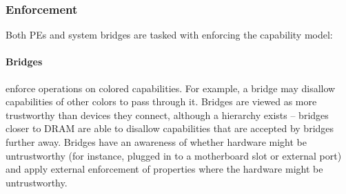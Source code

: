 

\subsubsection{Enforcement}
Both PEs and system bridges are tasked with enforcing the capability model:

\paragraph{Bridges} enforce operations on colored capabilities.  For example, a bridge may disallow capabilities of other colors to pass through it.  Bridges are viewed as more trustworthy than devices they connect, although a hierarchy exists -- bridges closer to DRAM are able to disallow capabilities that are accepted by bridges further away.  Bridges have an awareness of whether hardware might be untrustworthy (for instance, plugged in to a motherboard slot or external port) and apply external enforcement of properties where the hardware might be untrustworthy.

